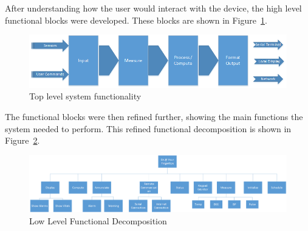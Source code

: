 \documentclass[12pt]{article} %
\begin{document}
    After understanding how the user would interact with the device, the high level
		functional blocks were developed. These blocks are shown in Figure~\ref{fig:func_top}.


    \begin{figure}[h]
      \centering
      \includegraphics[width=\textwidth]{../design/top_level_function_block_diagram}
      \caption{Top level system functionality}
      \label{fig:func_top}
    \end{figure}

    The functional blocks were then refined further, showing the main functions
    the system needed to perform.  This refined functional decomposition is shown
    in Figure~\ref{fig:func_low}.

    \begin{figure}[h]
      \centering
      \includegraphics[width=\textwidth]{../design/Functional_decomposition}
      \caption{Low Level Functional Decomposition}
      \label{fig:func_low}
    \end{figure}
\end{document}
